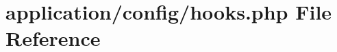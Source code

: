 \hypertarget{application_2config_2hooks_8php}{}\section{application/config/hooks.php File Reference}
\label{application_2config_2hooks_8php}
